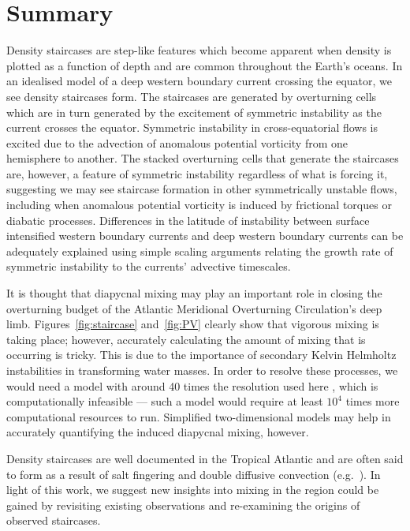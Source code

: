 \section{Summary}
\label{sec:conc}
Density staircases are step-like features which become apparent when density is plotted as a function of depth and are common throughout the Earth's oceans. In an idealised model of a deep western boundary current crossing the equator, we see density staircases form. The staircases are generated by overturning cells which are in turn generated by the excitement of symmetric instability as the current crosses the equator. Symmetric instability in cross-equatorial flows is excited due to the advection of anomalous potential vorticity from one hemisphere to another. The stacked overturning cells that generate the staircases are, however, a feature of symmetric instability regardless of what is forcing it, suggesting we may see staircase formation in other symmetrically unstable flows, including when anomalous potential vorticity is induced by frictional torques or diabatic processes. Differences in the latitude of instability between surface intensified western boundary currents and deep western boundary currents can be adequately explained using simple scaling arguments relating the growth rate of symmetric instability to the currents' advective timescales.

It is thought that diapycnal mixing may play an important role in closing the overturning budget of the Atlantic Meridional Overturning Circulation's deep limb. Figures~\ref{fig:staircase} and~\ref{fig:PV} clearly show that vigorous mixing is taking place; however, accurately calculating the amount of mixing that is occurring is tricky. This is due to the importance of secondary Kelvin Helmholtz instabilities in transforming water masses. In order to resolve these processes, we would need a model with around 40 times the resolution used here \citep{Bachman2014}, which is computationally infeasible --- such a model would require at least $10^4$ times more computational resources to run. Simplified two-dimensional models may help in accurately quantifying the induced diapycnal mixing, however.

Density staircases are well documented in the Tropical Atlantic and are often said to form as a result of salt fingering and double diffusive convection (e.g.~\citet{Schmitt1987, Schmitt2005}). In light of this work, we suggest new insights into mixing in the region could be gained by revisiting existing observations and re-examining the origins of observed staircases.
